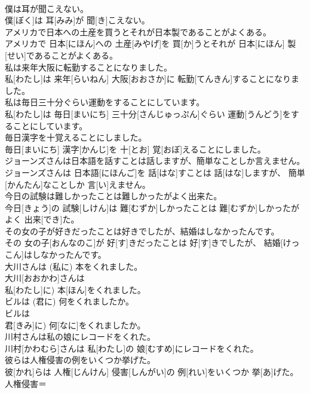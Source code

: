 \documentclass[8pt]{extreport}
\begin{document}
\begin{CJK}{UTF8}{min}
\\	僕は耳が聞こえない。	
\\	僕[ぼく]は 耳[みみ]が 聞[き]こえない。	
\\	アメリカで日本への土産を買うとそれが日本製であることがよくある。	
\\	アメリカで 日本[にほん]への 土産[みやげ]を 買[か]うとそれが 日本[にほん] 製[せい]であることがよくある。	
\\	私は来年大阪に転勤することになりました。	
\\	私[わたし]は 来年[らいねん] 大阪[おおさか]に 転勤[てんきん]することになりました。	
\\	私は毎日三十分ぐらい運動をすることにしています。	
\\	私[わたし]は 毎日[まいにち] 三十分[さんじゅっぷん]ぐらい 運動[うんどう]をすることにしています。	
\\	毎日漢字を十覚えることにしました。	
\\	毎日[まいにち] 漢字[かんじ]を 十[とお] 覚[おぼ]えることにしました。	
\\	ジョーンズさんは日本語を話すことは話しますが、簡単なことしか言えません。	
\\	ジョーンズさんは 日本語[にほんご]を 話[はな]すことは 話[はな]しますが、 簡単[かんたん]なことしか 言[い]えません。	
\\	今日の試験は難しかったことは難しかったがよく出来た。	
\\	今日[きょう]の 試験[しけん]は 難[むずか]しかったことは 難[むずか]しかったがよく 出来[でき]た。	
\\	その女の子が好きだったことは好きでしたが、結婚はしなかったんです。	
\\	その 女の子[おんなのこ]が 好[す]きだったことは 好[す]きでしたが、 結婚[けっこん]はしなかったんです。	
\\	大川さんは (私に) 本をくれました。	
\\	大川[おおかわ]さんは
\\	私[わたし]に) 本[ほん]をくれました。	
\\	ビルは (君に) 何をくれましたか。	
\\	ビルは
\\	君[きみ]に) 何[なに]をくれましたか。	
\\	川村さんは私の娘にレコードをくれた。	
\\	川村[かわむら]さんは 私[わたし]の 娘[むすめ]にレコードをくれた。	
\\	彼らは人権侵害の例をいくつか挙げた。	
\\	彼[かれ]らは 人権[じんけん] 侵害[しんがい]の 例[れい]をいくつか 挙[あ]げた。	人権侵害＝ 

\end{CJK}
\end{document}
